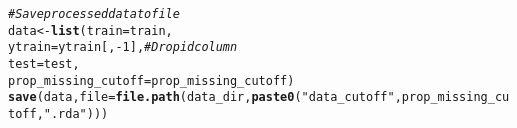 \documentclass{article}\usepackage[]{graphicx}\usepackage[]{color}
\makeatletter
\newcommand{\hlnum}[1]{\textcolor[rgb]{0.686,0.059,0.569}{#1}}%
\newcommand{\hlstr}[1]{\textcolor[rgb]{0.192,0.494,0.8}{#1}}%
\newcommand{\hlcom}[1]{\textcolor[rgb]{0.678,0.584,0.686}{\textit{#1}}}%
\newcommand{\hlopt}[1]{\textcolor[rgb]{0,0,0}{#1}}%
\newcommand{\hlstd}[1]{\textcolor[rgb]{0.345,0.345,0.345}{#1}}%
\newcommand{\hlkwb}[1]{\textcolor[rgb]{0.69,0.353,0.396}{#1}}%
\newcommand{\hlkwc}[1]{\textcolor[rgb]{0.333,0.667,0.333}{#1}}%
\newcommand{\hlkwd}[1]{\textcolor[rgb]{0.737,0.353,0.396}{\textbf{#1}}}%
\newenvironment{kframe}{%
 \def\at@end@of@kframe{}%
 \ifinner\ifhmode%
  \def\at@end@of@kframe{\end{minipage}}%
  \begin{minipage}{\columnwidth}%
 \fi\fi%
 \def\FrameCommand##1{\hskip\@totalleftmargin \hskip-\fboxsep
 \colorbox{shadecolor}{##1}\hskip-\fboxsep
     \hskip-\linewidth \hskip-\@totalleftmargin \hskip\columnwidth}%
 \MakeFramed {\advance\hsize-\width
   \@totalleftmargin\z@ \linewidth\hsize
   \@setminipage}}%
 {\par\unskip\endMakeFramed%
 \at@end@of@kframe}
\newenvironment{knitrout}{}{} %
\makeatother
\begin{document}
\begin{knitrout}
\begin{kframe}
\begin{alltt}
\hlcom{# Save processed data to file}
\hlstd{data} \hlkwb{<-} \hlkwd{list}\hlstd{(}\hlkwc{train} \hlstd{= train,}
             \hlkwc{ytrain} \hlstd{= ytrain[,} \hlopt{-}\hlnum{1}\hlstd{],} \hlcom{# Drop id column }
             \hlkwc{test} \hlstd{= test,}
             \hlkwc{prop_missing_cutoff} \hlstd{= prop_missing_cutoff)}
\hlkwd{save}\hlstd{(data,} \hlkwc{file} \hlstd{=} \hlkwd{file.path}\hlstd{(data_dir,} \hlkwd{paste0}\hlstd{(}\hlstr{"data_cutoff"}\hlstd{, prop_missing_cutoff,} \hlstr{".rda"}\hlstd{)))}
\end{alltt}
\end{kframe}
\end{knitrout}
                                                                                                                                                                                                                                                                                                                                                                                                                                                                                                                                                                                                
\end{document}
